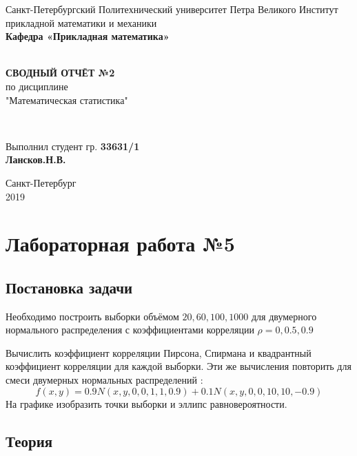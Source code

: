 \documentclass[12pt]{report}
\renewcommand{\listoffigures}{\begingroup  %
\tocsection
\tocfile{\listfigurename}{lof}
\endgroup}
\renewcommand{\listoftables}{\begingroup  %
\tocsection
\tocfile{\listtablename}{lot}
\endgroup}
\begin{document}
\begin{titlepage}
	\center
		Санкт-Петербургский Политехнический 
		университет Петра Великого
		Институт прикладной математики и механики
		\\ \textbf{Кафедра «Прикладная математика»}

	\vfill ~
	\textbf{
		\\ \large СВОДНЫЙ ОТЧЁТ №2
	}
	\\	по дисциплине 
	\\	"Математическая статистика"

	\vfill ~

	Выполнил студент гр. \textbf{33631/1} \\
	\textbf{Лансков.Н.В.} \\ 

\vfill

{\large}	Санкт-Петербург
\\ 2019
\end{titlepage}


\tableofcontents 
\newpage
\listoffigures
\newpage
\listoftables
\newpage

\chapter{Лабораторная работа №5}
\section{Постановка задачи}
Необходимо построить выборки объёмом $20, 60, 100, 1000$ для двумерного нормального распределения с коэффициентами корреляции $\rho = 0, 0.5, 0.9$

Вычислить коэффициент корреляции Пирсона, Спирмана и квадрантный коэффициент корреляции для каждой выборки. Эти же вычисления повторить для смеси двумерных нормальных распределений \cite{mix}: 
\begin{equation}
    f(x,y) = 0.9N(x,y,0,0,1,1,0.9)+0.1N(x,y,0,0,10,10,-0.9)
\end{equation}
На графике изобразить точки выборки и эллипс равновероятности.

\section{Теория}
\end{document}
